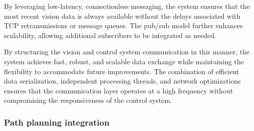 By leveraging low-latency, connectionless messaging, the system ensures that the most recent vision data is always available without the delays associated with TCP retransmissions or message queues. The pub/sub model further enhances scalability, allowing additional subscribers to be integrated as needed.

By structuring the vision and control system communication in this manner, the system achieves fast, robust, and scalable data exchange while maintaining the flexibility to accommodate future improvements. The combination of efficient data serialization, independent processing threads, and network optimizations ensures that the communication layer operates at a high frequency without compromising the responsiveness of the control system. 




\subsubsection{Path planning integration}






